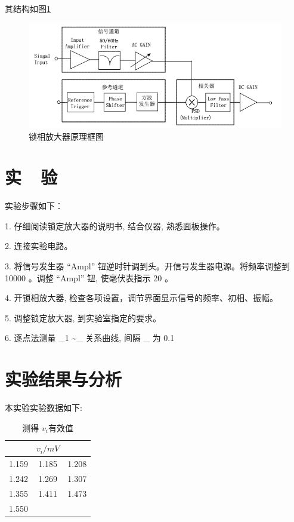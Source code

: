 \documentclass{buaaemp}
\begin{document}
其结构如图\ref{fig:fig2}
\begin{figure}
    \centering
    \includegraphics[width=\linewidth]{image/锁相放大器.png}
    \caption{锁相放大器原理框图}
    \label{fig:fig2}
\end{figure}

\section{实~~验}
实验步骤如下：

1. 仔细阅读锁定放大器的说明书, 结合仪器, 熟悉面板操作。

2. 连接实验电路。

3. 将信号发生器 “Ampl” 钮逆时针调到头。开信号发生器电源。将频率调整到  10000   。调整 “Ampl” 钮, 使毫伏表指示  20   。

4. 开锁相放大器, 检查各项设置，调节界面显示信号的频率、初相、振幅。

5. 调整锁定放大器, 到实验室指定的要求。

6. 逐点法测量  _{1} \sim {}_{}  关系曲线, 间隔  \Delta {}_{}  为  0.1   

\section{实验结果与分析}
本实验实验数据如下:

\begin{table}[h]
\centering
\captionnamefont{\wuhao\bf\heiti}
\captiontitlefont{\wuhao\bf\heiti}
\caption{测得 $v_i$有效值} \label{tab:eg1}
\liuhao
\begin{tabular}{ccc}
\toprule
  &$v_i /mV$ &  \space  \\
\midrule 
1.159 & 1.185 &1.208\\
1.242 &1.269 &1.307 \\
 1.355 & 1.411 & 1.473\\
 1.550 & & \\
\bottomrule
\end{tabular}
\end{table}
\end{document}

